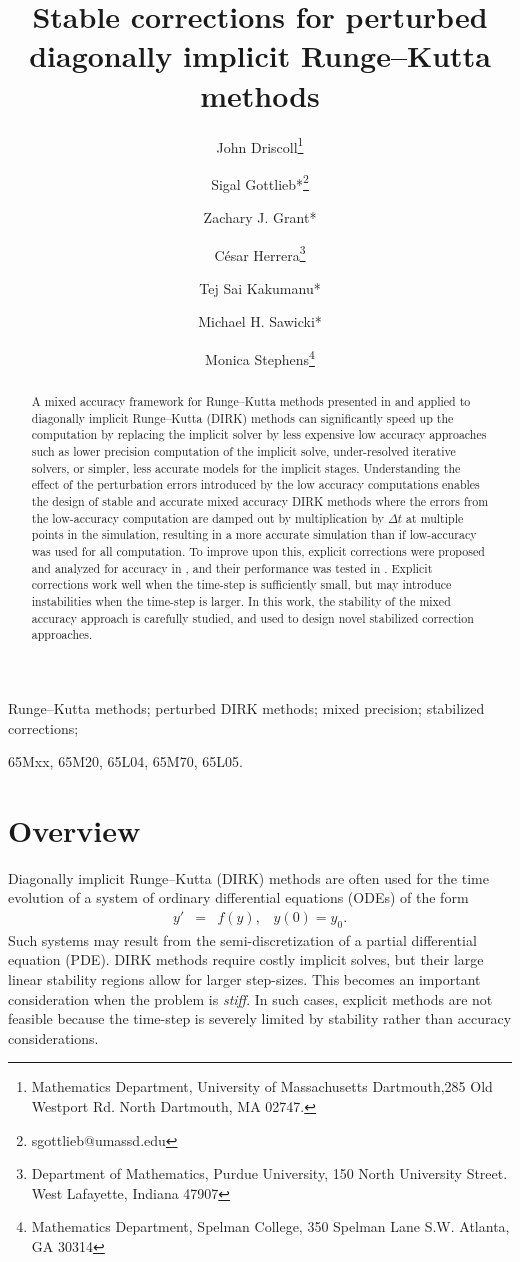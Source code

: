 \documentclass{siamart251104}
\title{Stable corrections for  perturbed diagonally  implicit Runge--Kutta methods}
\author{John Driscoll\thanks{Mathematics Department, University of Massachusetts Dartmouth,285 Old Westport Rd. North Dartmouth, MA 02747.}\and Sigal Gottlieb*\thanks{sgottlieb@umassd.edu}\and
Zachary J. Grant*\and
César Herrera\thanks{Department of Mathematics, Purdue University, 150 North University Street.
West Lafayette, Indiana 47907}\and
Tej Sai Kakumanu*\and
Michael H. Sawicki*\and
Monica Stephens\thanks{Mathematics Department, Spelman College, 350 Spelman Lane S.W.  Atlanta, GA 30314} 
}
\newcommand{\dt}{\Delta t}
\begin{document}
\maketitle




\begin{abstract}  
A mixed accuracy framework for Runge--Kutta methods presented in \cite{Grant2022}
and applied to diagonally implicit Runge--Kutta  (DIRK) methods
can significantly speed up the computation by replacing the 
implicit solver by less expensive low accuracy approaches
such as lower precision computation of the implicit solve, under-resolved iterative solvers,
or simpler, less accurate models for the implicit stages. 
Understanding the effect of the perturbation errors introduced by the 
low accuracy computations enables the design of  stable and accurate
mixed accuracy DIRK methods where the errors from the  
low-accuracy computation  are damped out by multiplication 
by $\dt$ at  multiple points in the simulation, 
resulting in a more accurate simulation than if 
low-accuracy was used for all computation.
To improve upon this,  explicit corrections were proposed and
analyzed for accuracy in \cite{Grant2022}, and their performance was 
tested in \cite{Burnett1, Burnett2}. Explicit corrections work well when the 
time-step is sufficiently small,  but may introduce instabilities 
when the time-step is larger. In this work, the stability of the mixed accuracy approach
is carefully studied, and used to design novel stabilized correction approaches.
  \end{abstract}

 Runge--Kutta methods; perturbed DIRK methods; mixed precision;
stabilized corrections;

 65Mxx, 65M20, 	65L04, 65M70, 65L05.

  
\section{Overview} 
Diagonally implicit Runge--Kutta (DIRK) methods \cite{CarpenterRK} are often
used for the time evolution of a system of ordinary
differential equations (ODEs) of the form
\begin{eqnarray} \label{ODE}
    y' &=& f(y), \; \; \; y(0) = y_0.
\end{eqnarray} 
Such systems may result from the semi-discretization of a partial differential equation (PDE).
DIRK methods require costly implicit solves, but
their large linear stability  regions allow for 
larger step-sizes. This becomes an important consideration when the problem is {\em stiff}.  
In such cases, explicit methods are not feasible because the time-step is severely limited by stability rather than accuracy considerations.
\end{document}
